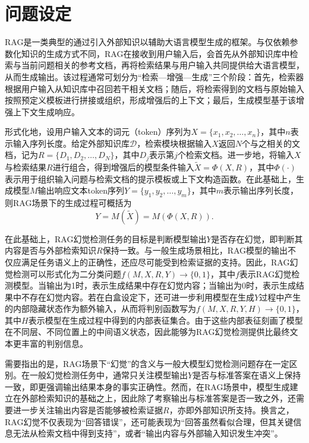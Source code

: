 \section{问题设定}

RAG是一类典型的通过引入外部知识以辅助大语言模型生成的框架。与仅依赖参数化知识的生成方式不同，RAG在接收到用户输入后，会首先从外部知识库中检索与当前问题相关的参考文档，再将检索结果与用户输入共同提供给大语言模型，从而生成输出。该过程通常可划分为“检索—增强—生成”三个阶段：首先，检索器根据用户输入从知识库中召回若干相关文档；随后，将检索得到的文档与原始输入按照预定义模板进行拼接或组织，形成增强后的上下文；最后，生成模型基于该增强上下文生成响应。

形式化地，设用户输入文本的词元（token）序列为$X=\{x_1,x_2,\ldots,x_n\}$，其中$n$表示输入序列长度。给定外部知识库$\mathcal{D}$，检索模块根据输入$X$返回$N$个与之相关的文档，记为$R=\{D_1,D_2,\ldots,D_N\}$，其中$D_j$表示第$j$个检索文档。进一步地，将输入$X$与检索结果$R$进行组合，得到增强后的模型条件输入$\widetilde{X}=\Phi(X,R)$，其中$\Phi(\cdot)$表示用于组织输入问题与检索文档的提示模板或上下文构造函数。在此基础上，生成模型$M$输出响应文本token序列$Y=\{y_1,y_2,\ldots,y_m\}$，其中$m$表示输出序列长度，则RAG场景下的生成过程可概括为
\begin{equation}
Y=M(\widetilde{X})=M(\Phi(X,R)).
\end{equation}

在此基础上，RAG幻觉检测任务的目标是判断模型输出$Y$是否存在幻觉，即判断其内容是否与外部检索知识$R$保持一致。与一般生成场景相比，RAG模型的输出不仅应满足任务语义上的正确性，还应尽可能受到检索证据的支持。因此，RAG幻觉检测可以形式化为二分类问题$f(M,X,R,Y)\rightarrow \{0,1\}$，其中$f$表示RAG幻觉检测模型。当输出为1时，表示生成结果中存在幻觉内容；当输出为0时，表示生成结果中不存在幻觉内容。若在白盒设定下，还可进一步利用模型在生成$Y$过程中产生的内部隐藏状态作为额外输入，从而将判别函数写为$f(M,X,R,Y,H)\rightarrow \{0,1\}$，其中$H$表示模型在生成过程中得到的内部表征集合。由于这些内部表征刻画了模型在不同层、不同位置上的中间语义状态，因此能够为RAG幻觉检测提供比最终文本更丰富的判别信息。

需要指出的是，RAG场景下“幻觉”的含义与一般大模型幻觉检测问题存在一定区别。在一般幻觉检测任务中，通常只关注模型输出$Y$是否与标准答案在语义上保持一致，即更强调输出结果本身的事实正确性。然而，在RAG场景中，模型生成建立在外部检索知识的基础之上，因此除了考察输出与标准答案是否一致之外，还需要进一步关注输出内容是否能够被检索证据$R$，亦即外部知识所支持。换言之，RAG幻觉不仅表现为“回答错误”，还可能表现为“回答虽然看似合理，但其关键信息无法从检索文档中得到支持”，或者“输出内容与外部输入知识发生冲突”。

